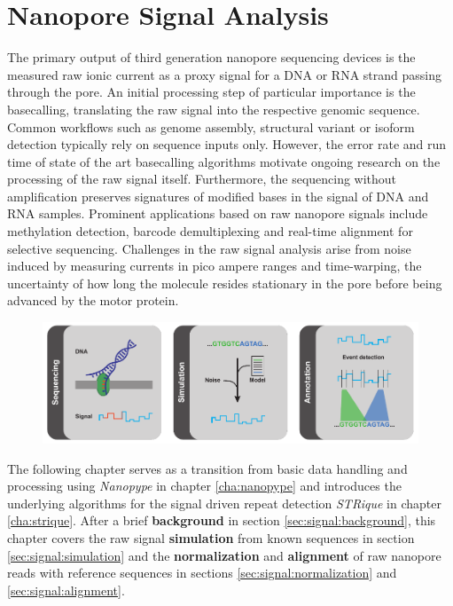 \chapter{Nanopore Signal Analysis}
\label{cha:signal}

The primary output of third generation nanopore sequencing devices is the measured raw ionic current as a proxy signal for a DNA or RNA strand passing through the pore. 
An initial processing step of particular importance is the basecalling, translating the raw signal into the respective genomic sequence.
Common workflows such as genome assembly, structural variant or isoform detection typically rely on sequence inputs only.
However, the error rate and run time of state of the art basecalling algorithms motivate ongoing research on the processing of the raw signal itself. Furthermore, the sequencing without amplification preserves signatures of modified bases in the signal of DNA and RNA samples.
Prominent applications based on raw nanopore signals include methylation detection, barcode demultiplexing and real-time alignment for selective sequencing.
Challenges in the raw signal analysis arise from noise induced by measuring currents in pico ampere ranges and time-warping, the uncertainty of how long the molecule resides stationary in the pore before being advanced by the motor protein.


\begin{figure}[h]
    \centering
    \includegraphics[width=1.0\textwidth]{figures/signal/GA.pdf}
    \label{fig:signal:ga}
\end{figure}


The following chapter serves as a transition from basic data handling and processing using \textit{Nanopype} in chapter \ref{cha:nanopype} and introduces the underlying algorithms for the signal driven repeat detection \textit{STRique} in chapter \ref{cha:strique}.
After a brief \textbf{background} in section \ref{sec:signal:background}, this chapter covers the raw signal \textbf{simulation} from known sequences in section \ref{sec:signal:simulation} and the \textbf{normalization} and \textbf{alignment} of raw nanopore reads with reference sequences in sections \ref{sec:signal:normalization} and \ref{sec:signal:alignment}.

